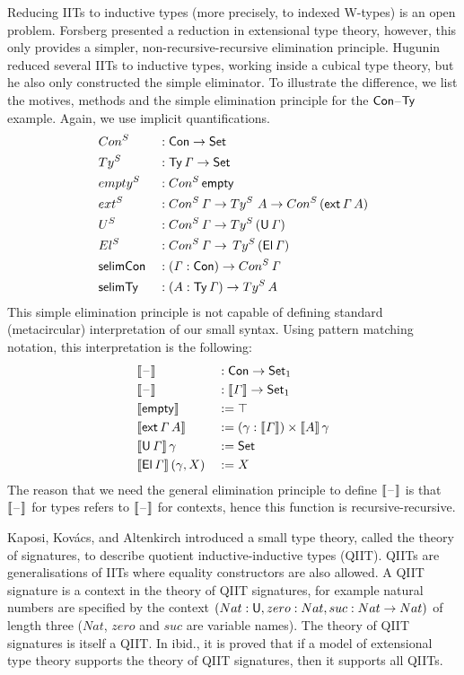 \documentclass[a4paper,UKenglish,cleveref, autoref]{lipics-v2019}
\begin{document}
Reducing IITs to inductive types (more precisely, to indexed W-types)
is an open problem. Forsberg \cite{forsberg-phd} presented a reduction in
extensional type theory, however, this only provides a simpler,
non-recursive-recursive elimination principle. Hugunin \cite{jasper}
reduced several IITs to inductive types, working inside a cubical type
theory, but he also only constructed the simple eliminator. To
illustrate the difference, we list the motives, methods and the
simple elimination principle for the $\mathsf{Con}$--$\mathsf{Ty}$ example. Again, we
use implicit quantifications.
\begin{alignat*}{5}
  & Con^S && : \mathsf{Con}\rightarrow\mathsf{Set} \\
  & Ty^S && : \mathsf{Ty}\,\mathit{\Gamma}\rightarrow\mathsf{Set} \\
  & {empty}^S && : Con^S\,\mathsf{empty} \\
  & {ext}^S && : Con^S\,\mathit{\Gamma}\rightarrow Ty^S\,\,A\rightarrow Con^S\,(\mathsf{ext}\,\mathit{\Gamma}\,A) \\
  & U^S && : Con^S\,\mathit{\Gamma}\rightarrow Ty^S\,(\mathsf{U}\,\mathit{\Gamma}) \\
  & El^S && : Con^S\,\mathit{\Gamma}\rightarrow\,Ty^S\,(\mathsf{El}\,\mathit{\Gamma}) \\
  & \mathsf{selimCon} && : (\mathit{\Gamma}:\mathsf{Con})\rightarrow Con^S\,\mathit{\Gamma} \\
  & \mathsf{selimTy} && : (A:\mathsf{Ty}\,\mathit{\Gamma})\rightarrow Ty^S\,A
\end{alignat*}
This simple elimination principle is not capable of defining standard
(metacircular) interpretation \cite{ttintt} of our small syntax. Using
pattern matching notation, this interpretation is the following:
\begin{alignat*}{5}
  & \llbracket\mathord{\hspace{1pt}\text{--}\hspace{1pt}}\rrbracket && : \mathsf{Con}\rightarrow\mathsf{Set}_1 \\
  & \llbracket\mathord{\hspace{1pt}\text{--}\hspace{1pt}}\rrbracket && : \llbracket\mathit{\Gamma}\rrbracket\rightarrow\mathsf{Set}_1 \\
  & \llbracket\mathsf{empty}\rrbracket && := \top \\
  & \llbracket\mathsf{ext}\,\mathit{\Gamma}\,A\rrbracket && := (\gamma:\llbracket\mathit{\Gamma}\rrbracket)\times\llbracket A\rrbracket\,\gamma \\
  & \llbracket\mathsf{U}\,\mathit{\Gamma}\rrbracket\,\gamma && := \mathsf{Set} \\
  & \llbracket\mathsf{El}\,\mathit{\Gamma}\rrbracket\,(\gamma,X) && := X
\end{alignat*}
The reason that we need the general elimination principle to define
$\llbracket\mathord{\hspace{1pt}\text{--}\hspace{1pt}}\rrbracket$ is that $\llbracket\mathord{\hspace{1pt}\text{--}\hspace{1pt}}\rrbracket$ for types refers to
$\llbracket\mathord{\hspace{1pt}\text{--}\hspace{1pt}}\rrbracket$ for contexts, hence this function is
recursive-recursive.

Kaposi, Kov{\'a}cs, and Altenkirch
\cite{Kaposi:2019:CQI:3302515.3290315} introduced a small type theory,
 called the theory of signatures, to describe quotient
inductive-inductive types (QIIT). QIITs are generalisations of IITs
where equality constructors are also allowed. A QIIT signature is a
context in the theory of QIIT signatures, for example natural numbers
are specified by the context $(Nat:\mathsf{U},zero:Nat,suc:Nat\rightarrow Nat)$ of
length three ($Nat$, $zero$ and $suc$ are variable names). The theory
of QIIT signatures is itself a QIIT. In ibid., it is proved that if a
model of extensional type theory supports the theory of QIIT
signatures, then it supports all QIITs.
\end{document}
